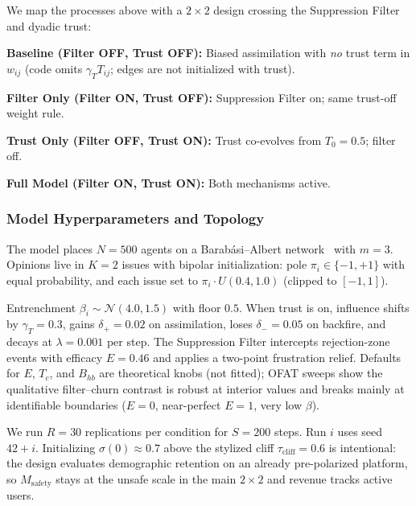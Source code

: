 We map the processes above with a $2 \times 2$ design crossing the Suppression Filter and dyadic trust:
\begin{enumerate*}
    \item \textbf{Baseline (Filter OFF, Trust OFF):} Biased assimilation with \emph{no} trust term in $w_{ij}$ (code omits $\gamma_T T_{ij}$; edges are not initialized with trust).
    \item \textbf{Filter Only (Filter ON, Trust OFF):} Suppression Filter on; same trust-off weight rule.
    \item \textbf{Trust Only (Filter OFF, Trust ON):} Trust co-evolves from $T_0=0.5$; filter off.
    \item \textbf{Full Model (Filter ON, Trust ON):} Both mechanisms active.
\end{enumerate*}

\subsubsection{Model Hyperparameters and Topology}
The model places $N = 500$ agents on a Barab{\'a}si--Albert network~\citep{Barabasi1999} with $m = 3$. Opinions live in $K = 2$ issues with bipolar initialization: pole $\pi_i \in \{-1,+1\}$ with equal probability, and each issue set to $\pi_i \cdot U(0.4,1.0)$ (clipped to $[-1,1]$).

Entrenchment $\beta_i \sim \mathcal{N}(4.0, 1.5)$ with floor $0.5$. When trust is on, influence shifts by $\gamma_T=0.3$, gains $\delta_+=0.02$ on assimilation, loses $\delta_-=0.05$ on backfire, and decays at $\lambda=0.001$ per step. The Suppression Filter intercepts rejection-zone events with efficacy $E=0.46$ and applies a two-point frustration relief. Defaults for $E$, $T_c$, and $B_{hb}$ are theoretical knobs (not fitted); OFAT sweeps show the qualitative filter--churn contrast is robust at interior values and breaks mainly at identifiable boundaries ($E=0$, near-perfect $E=1$, very low $\beta$).

We run $R=30$ replications per condition for $S=200$ steps. Run $i$ uses seed $42+i$. Initializing $\sigma(0)\approx 0.7$ above the stylized cliff $\tau_{\text{cliff}}=0.6$ is intentional: the design evaluates demographic retention on an already pre-polarized platform, so $M_{\text{safety}}$ stays at the unsafe scale in the main $2\times2$ and revenue tracks active users.

